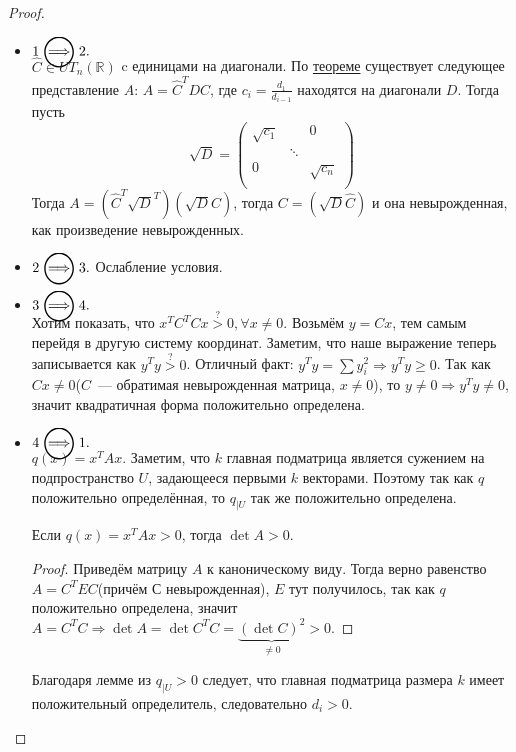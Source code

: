 \begin{proof}\leavevmode
    \begin{itemize}
        \item $1 \ora 2.$\\
            $\hat{C}\in UT_n(\mathbb{R})$ c единицами на диагонали.
            По \hyperref[stm:О приведении квадратичной формы к каноническому виду]{теореме} 
            существует следующее представление $A$: $A = \hat{C}^T D \hat{C}$,
            где $c_i = \frac{d_1}{d_{i - 1}}$ находятся на диагонали $D$.
            Тогда пусть
            \[
                \sqrt{D} = 
                \begin{pmatrix}
                    \sqrt{c_1} & & 0 \\
                    & \ddots &\\
                    0 & & \sqrt{c_n}\\
                \end{pmatrix}
            \]
            Тогда $A = \left(\hat{C}^T\sqrt{D}^T\right)\left(\sqrt{D}\hat{C}\right)$, тогда 
            $C=\left(\sqrt{D}\hat{C}\right)$ и она невырожденная, как произведение 
            невырожденных.
        \item
            $2 \ora 3.$ Ослабление условия.
        \item
            $3 \ora 4.$\\
            Хотим показать, что $x^TC^T Cx \stackrel{?}{>} 0, \forall x\not=0$.
            Возьмём  $y  = Cx$, тем самым перейдя в другую систему координат.
            Заметим, что наше выражение теперь записывается как  $y^Ty \stackrel{?}{>} 0$.
            Отличный факт: $y^T y = \sum y_i^2 \Rightarrow y^T y \ge 0$.
            Так как $Cx \not =0$($C$~--- обратимая невырожденная матрица, $x\neq 0$),
            то $y \not= 0 \Rightarrow y^T y\neq 0$, значит квадратичная форма положительно определена.
        \item
            $4 \ora 1.$\\
            $q(x) = x^T A x$. Заметим, что $k$ главная подматрица является сужением
            на подпространство $U$, задающееся первыми $k$ векторами. Поэтому так как
            $q$ положительно определённая, то $q_{|U}$ так же положительно определена.
            \\
            \begin{lemma}
                Если $q(x)  = x^T A x > 0$, тогда  $\det A > 0$.
            \end{lemma}
            \begin{proof}
                Приведём матрицу $A$ к каноническому виду. Тогда верно
                равенство $A = C^T E C$(причём $С$ невырожденная), $E$ тут получилось,
                так как $q$ положительно определена, значит $A = C^T C \Rightarrow \det A =
                \det C^T C = \underbrace{(\det C)^2}_{\not= 0} > 0$.
            \end{proof}
            Благодаря лемме из $q_{|U} > 0$ следует, что главная подматрица размера $k$
            имеет положительный определитель, следовательно $d_i > 0$.
    \end{itemize}
\end{proof}
